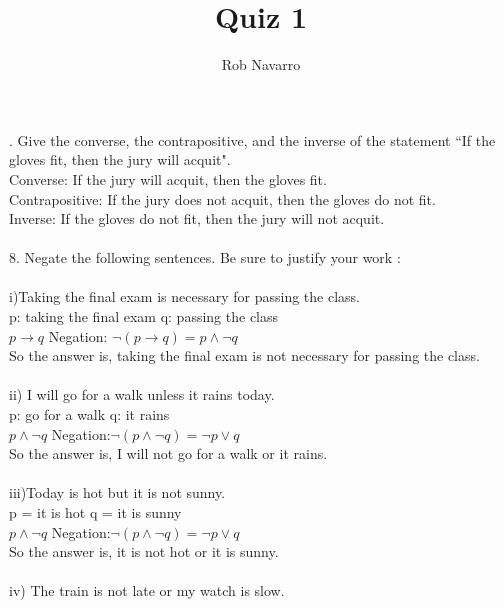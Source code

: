 \documentclass[11pt, oneside]{article}   	%
\title{Quiz 1}
\author{Rob Navarro}
\begin{document}
\maketitle

. Give the converse, the contrapositive, and the inverse of the statement ``If the gloves fit, then the jury will acquit".\\
Converse: If the jury will acquit, then the gloves fit. \\
Contrapositive: If the jury does not acquit, then the gloves do not fit. \\
Inverse: If the gloves do not fit, then the jury will not acquit.\\\\
8.  Negate the following sentences. Be sure to justify your work : \\\\
i)Taking the final exam is necessary for passing the class.\\
\indent p: taking the final exam   q: passing the class\\
\indent $p\to q$  Negation: $\neg(p\to q) = p\wedge\neg q$\\
\indent So the answer is, taking the final exam is not necessary for passing the class. \\\\
ii) I will go for a walk unless it rains today.\\
\indent p: go for a walk   q: it rains \\
\indent $p\wedge\neg q $ Negation:$ \neg (p\wedge\neg q) = \neg p\lor q$\\
\indent So the answer is, I will not go for a walk or it rains. \\\\
iii)Today is hot but it is not sunny.\\
\indent p = it is hot  q = it is sunny\\
\indent $p\wedge\neg q$  Negation:$ \neg (p\wedge\neg q) = \neg p\lor q$\\
\indent So the answer is, it is not hot or it is sunny.\\\\
iv) The train is not late or my watch is slow. \\
\end{document}
